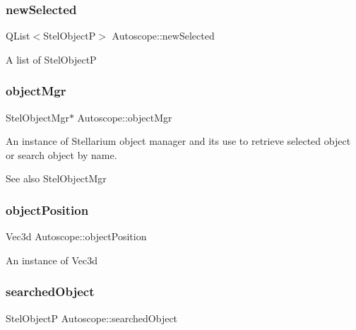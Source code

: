 \subsubsection{\texorpdfstring{newSelected}{newSelected}}
{\footnotesize\ttfamily Q\+List$<$Stel\+ObjectP$>$ Autoscope\+::new\+Selected\hspace{0.3cm}{\ttfamily [private]}}

A list of Stel\+ObjectP \mbox{\label{class_autoscope_aec2c452e45c0a7d045417a8656aa7c45}} 
\subsubsection{\texorpdfstring{objectMgr}{objectMgr}}
{\footnotesize\ttfamily Stel\+Object\+Mgr$\ast$ Autoscope\+::object\+Mgr}



An instance of Stellarium object manager and it\textquotesingle{}s use to retrieve selected object or search object by name. 

\begin{DoxySeeAlso}{See also}
Stel\+Object\+Mgr 
\end{DoxySeeAlso}
\mbox{\label{class_autoscope_aff4d8365cc96689c79f3370ebde45b9e}} 
\subsubsection{\texorpdfstring{objectPosition}{objectPosition}}
{\footnotesize\ttfamily Vec3d Autoscope\+::object\+Position\hspace{0.3cm}{\ttfamily [private]}}

An instance of Vec3d \mbox{\label{class_autoscope_aba59abee95b4b5443709dce1d61a3498}} 
\subsubsection{\texorpdfstring{searchedObject}{searchedObject}}
{\footnotesize\ttfamily Stel\+ObjectP Autoscope\+::searched\+Object\hspace{0.3cm}{\ttfamily [private]}}

